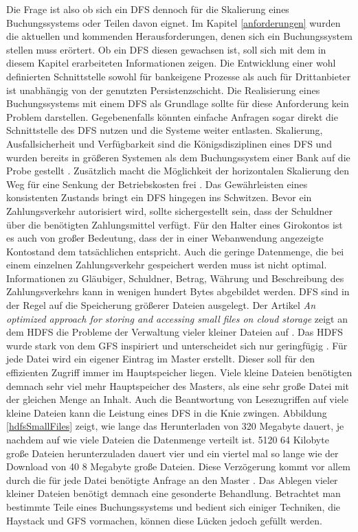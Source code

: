 \documentclass[12pt,oneside,a4paper,parskip]{scrbook}
\begin{document}
Die Frage ist also ob sich ein DFS dennoch für die Skalierung eines Buchungssystems oder Teilen davon eignet. Im Kapitel \ref{anforderungen} wurden die aktuellen und kommenden Herausforderungen, denen sich ein Buchungssystem stellen muss erörtert. Ob ein DFS diesen gewachsen ist, soll sich mit dem in diesem Kapitel erarbeiteten Informationen zeigen.
Die Entwicklung einer wohl definierten Schnittstelle sowohl für bankeigene Prozesse als auch für Drittanbieter ist unabhängig von der genutzten Persistenzschicht. Die Realisierung eines Buchungssystems mit einem DFS als Grundlage sollte für diese Anforderung kein Problem darstellen. Gegebenenfalls könnten einfache Anfragen sogar direkt die Schnittstelle des DFS nutzen und die Systeme weiter entlasten.
Skalierung, Ausfallsicherheit und Verfügbarkeit sind die Königsdisziplinen eines DFS und wurden bereits in größeren Systemen als dem Buchungssystem einer Bank auf die Probe gestellt \cite{largeHadoop}. Zusätzlich macht die Möglichkeit der horizontalen Skalierung den Weg für eine Senkung der Betriebskosten frei \cite{BASE}\cite{rdbmssuck}. Das Gewährleisten eines konsistenten Zustands bringt ein DFS hingegen ins Schwitzen. Bevor ein Zahlungsverkehr autorisiert wird, sollte sichergestellt sein, dass der Schuldner über die benötigten Zahlungsmittel verfügt. Für den Halter eines Girokontos ist es auch von großer Bedeutung, dass der in einer Webanwendung angezeigte Kontostand dem tatsächlichen entspricht. Auch die geringe Datenmenge, die bei einem einzelnen Zahlungsverkehr gespeichert werden muss ist nicht optimal. Informationen zu Gläubiger, Schuldner, Betrag, Währung und Beschreibung des Zahlungsverkehrs kann in wenigen hundert Bytes abgebildet werden. DFS sind in der Regel auf die Speicherung größerer Dateien ausgelegt. Der Artikel \textit{An optimized approach for storing and accessing small files on cloud storage} zeigt an dem HDFS die Probleme der Verwaltung vieler kleiner Dateien auf \cite{hdfsSmallFiles}. Das HDFS wurde stark von dem GFS inspiriert und unterscheidet sich nur geringfügig \cite{hdfsGfs}. Für jede Datei wird ein eigener Eintrag im Master erstellt. Dieser soll für den effizienten Zugriff immer im Hauptspeicher liegen. Viele kleine Dateien benötigten demnach sehr viel mehr Hauptspeicher des Masters, als eine sehr große Datei mit der gleichen Menge an Inhalt. Auch die Beantwortung von Lesezugriffen auf viele kleine Dateien kann die Leistung eines DFS in die Knie zwingen. Abbildung \ref{hdfsSmallFiles} zeigt, wie lange das Herunterladen von 320 Megabyte dauert, je nachdem auf wie viele Dateien die Datenmenge verteilt ist. 5120 64 Kilobyte große Dateien herunterzuladen dauert vier und ein viertel mal so lange wie der Download von 40 8 Megabyte große Dateien. Diese Verzögerung kommt vor allem durch die für jede Datei benötigte Anfrage an den Master \cite{hdfsSmallFiles}. Das Ablegen vieler kleiner Dateien benötigt demnach eine gesonderte Behandlung. Betrachtet man bestimmte Teile eines Buchungssystems und bedient sich einiger Techniken, die Haystack und GFS vormachen, können diese Lücken jedoch gefüllt werden.
\end{document}
